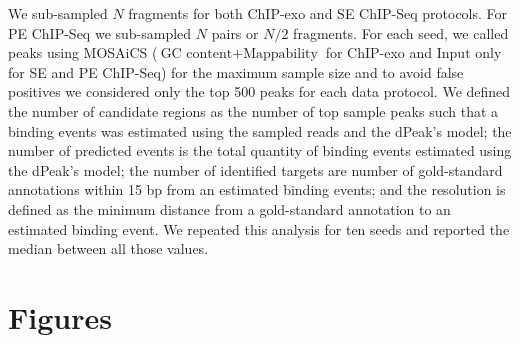 \documentclass{bmcart}
\begin{document}
We sub-sampled $N$ fragments for both ChIP-exo and SE ChIP-Seq
protocols. For PE ChIP-Seq we sub-sampled $N$ pairs or $N/2$
fragments. For each seed, we called peaks using MOSAiCS \cite{mosaics}
($\mbox{GC content} + \mbox{Mappability}$ for ChIP-exo and
$\mbox{Input only}$ for SE and PE ChIP-Seq) for the maximum sample
size and to avoid false positives we considered only the top 500 peaks
for each data protocol. We defined the number of candidate regions as
the number of top sample peaks such that a binding events was
estimated using the sampled reads and the dPeak's model; the number of
predicted events is the total quantity of binding events estimated
using the dPeak's model; the number of identified targets are number
of gold-standard annotations within 15 bp from an estimated binding
events; and the resolution is defined as the minimum distance from a
gold-standard annotation to an estimated binding event. We repeated
this analysis for ten seeds and reported the median between all those
values.



\nocite{exo_gb}
\nocite{maplot1}
\nocite{maplot2}
\nocite{chipbeyond}
\nocite{meme}



\newpage

\section{Figures}
\end{document}
